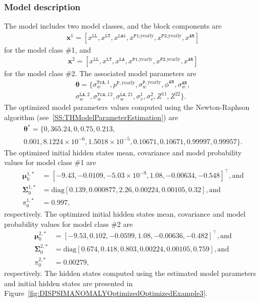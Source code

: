 \subsubsection{Model description}
\label{SS:ModelConstructionExample3}
The model includes two model classes, and the block components are 
\begin{gather*}
\mathbf{x}^{1}=[x^{\mathtt{LL}}, x^{\mathtt{LT}}, x^{\mathtt{LAc}}, x^{\mathtt{P1}\text{,yearly}} , x^{\mathtt{P2}\text{,yearly}}, x^{\mathtt{AR}}]
 \end{gather*}
for the model class \#1, and
\begin{gather*}
\mathbf{x}^{2}=[x^{\mathtt{LL}}, x^{\mathtt{LT}}, x^{\mathtt{LA}}, x^{\mathtt{P1}\text{,yearly}} , x^{\mathtt{P2}\text{,yearly}}, x^{\mathtt{AR}}]
 \end{gather*}
for the model class \#2.
The associated model parameters are
\begin{gather*}
\bm\theta=\{\sigma_{w}^{\mathtt{TcA},1}, p^{\mathtt{P}, \text{yearly}}, \sigma_{w}^{\mathtt{P}, \text{yearly}}, \phi^{\mathtt{AR}}, \sigma_{w}^{\mathtt{AR}}, \\
 \sigma_{w}^{\mathtt{LA},2}, \sigma_{w}^{\mathtt{TcA}, 12}, \sigma_{w}^{\mathtt{LA}, 21}, \sigma^{1}_{v}, \sigma^{2}_{v}, Z^{11},   Z^{22}\} \text{.}
 \end{gather*}
The optimized model parameters values computed using the Newton-Raphson algorithm (see~\ref{SS:THModelParameterEstimation}) are
\begin{gather*}
\bm\theta^{\text{*}}=\{0, 365.24, 0, 0.75, 0.213, \\
0.001, 8.1224\times10^{-6}, 1.5018\times10^{-5}, 0.10671, 0.10671, 0.99997, 0.99957\}.
\end{gather*}
The optimized initial hidden states mean, covariance  and model probability values for model class \#1 are 
\begin{align*}
 \bm \mu^{1,\text{*}}_{0} & = [	-9.43 ,	-0.0109	, -5.03\times 10^{-9}	, 1.08  ,	-0.00634	, -0.548    ]^{\intercal}, \text{and} \\
\bm\Sigma^{1,\text{*}}_{0}  & = \text{diag}[	0.139 ,	0.000877,	2.26  	,0.00224	,0.00105,	0.32     ],  \text{and} \\
 \pi_{0}^{1,\text{*}} & = 0.997,
\end{align*}
respectively.
The optimized initial hidden states mean, covariance  and model probability values for model class \#2 are 
\begin{align*}
 \bm \mu^{2,\text{*}}_{0} & = [	-9.53 ,	0.102 ,	-0.0599	,  1.08  ,	-0.00636, 	-0.482     ]^{\intercal}, \text{and} \\
 \bm\Sigma^{2,\text{*}}_{0}  & = \text{diag}[	0.674 	,0.418 ,	0.803 ,	0.00224,	0.00105	, 0.759    ], \text{and} \\
 \pi_{0}^{2,\text{*}} & = 0.00279,
\end{align*}
respectively.
The hidden states computed using the estimated model parameters and initial hidden states are presented in Figure~\ref{fig:DISPSIMANOMALYOptimizedOptimizedExample3}.

